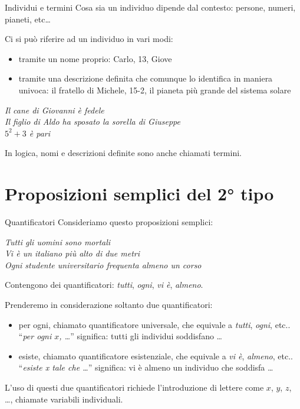 \documentclass[aspectratio=169,10pt,dvipsnames,handout]{beamer}
\begin{document}
\begin{frame}{Individui e termini}
	Cosa sia un individuo dipende dal contesto: persone, numeri, pianeti, etc\ldots

	\pause\medskip
	Ci si può riferire ad un individuo in vari modi:
	\begin{itemize}
		\item tramite un \alert{nome} proprio: Carlo, 13, Giove
		\item tramite una \alert{descrizione definita} che comunque lo identifica in maniera univoca: il fratello di Michele, 15-2, il pianeta più grande del sistema solare
	\end{itemize}
	\begin{example}
		\centering
		\itshape
		\alert{Il cane di Giovanni} è fedele\\
		\alert{Il figlio di Aldo} ha sposato \alert{la sorella di Giuseppe}\\
		\alert{$5^2+3$} è pari
	\end{example}
	\pause
	In logica, nomi e descrizioni definite sono anche chiamati \alert{termini}.
\end{frame}

\section{Proposizioni semplici del 2° tipo}

\begin{frame}{Quantificatori}
	Consideriamo questo proposizioni semplici:
	\begin{center}
		\itshape
		Tutti gli uomini sono mortali\\
		Vi è un italiano più alto di due metri\\
		Ogni studente universitario frequenta almeno un corso
	\end{center}
	Contengono dei \alert{quantificatori}: \emph{tutti}, \emph{ogni}, \emph{vi è}, \emph{almeno}.

	\pause
	\medskip
	Prenderemo in considerazione soltanto due quantificatori:
	\begin{itemize}
		\item \alert{per ogni}, chiamato \alert{quantificatore universale}, che equivale a \emph{tutti}, \emph{ogni}, etc..\\[0.1cm]
		``\emph{per ogni $x$, \ldots}'' significa: tutti gli individui soddisfano \ldots
		\item \alert{esiste}, chiamato \alert{quantificatore esistenziale}, che equivale a \emph{vi è}, \emph{almeno}, etc..\\[0.1cm]
		``\emph{esiste x tale che \ldots}'' significa: vi è almeno un individuo che soddisfa \ldots
	\end{itemize}

	\medskip
	L'uso di questi due quantificatori richiede l'introduzione di lettere come $x$, $y$, $z$, \ldots, chiamate \alert{variabili individuali}.
\end{frame}
\end{document}
